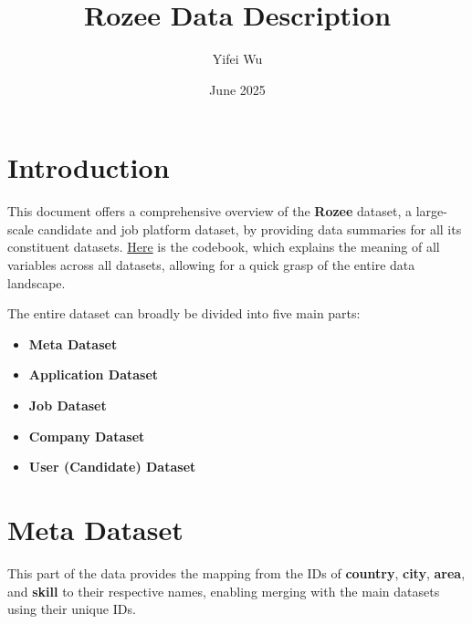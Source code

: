 \documentclass[12pt]{article}
\title{Rozee Data Description}
\author{Yifei Wu}
\date{June 2025}
\begin{document}
\onehalfspacing

\maketitle

\tableofcontents
\listoffigures
\listoftables

\newpage
\section{Introduction}

This document offers a comprehensive overview of the \textbf{Rozee} dataset, a large-scale candidate and job platform dataset, by providing data summaries for all its constituent datasets. \href{https://www.dropbox.com/scl/fi/a8c79h7csk0re5o6zjvpi/CSV_Data_Dictionary.docx-1.pdf?rlkey=xkcg05qf0cbp1seowtj5gf5kx&st=x3364isp&dl=0}{Here} is the codebook, which explains the meaning of all variables across all datasets, allowing for a quick grasp of the entire data landscape.

The entire dataset can broadly be divided into five main parts:
\begin{itemize}
    \item \textbf{Meta Dataset}
    \item \textbf{Application Dataset}
    \item \textbf{Job Dataset}
    \item \textbf{Company Dataset}
    \item \textbf{User (Candidate) Dataset}
\end{itemize}

\newpage 

\section{Meta Dataset}
This part of the data provides the mapping from the IDs of \textbf{country}, \textbf{city}, \textbf{area}, and \textbf{skill} to their respective names, enabling merging with the main datasets using their unique IDs.
\end{document}
